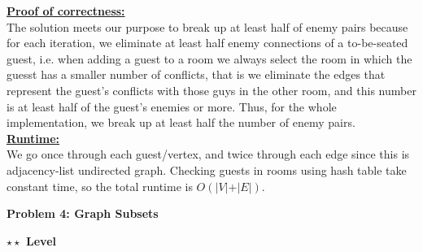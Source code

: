 \documentclass{article}\usepackage[utf8]{inputenc}
\begin{document}
%
\underline{\textbf{Proof of correctness:}}\\
The solution meets our purpose to break up at least half of enemy pairs because for each iteration, we eliminate at least half enemy connections of a to-be-seated guest, i.e. when adding a guest to a room we always select the room in which the guesst has a smaller number of conflicts, that is we eliminate the edges that represent the guest's conflicts with those guys in the other room, and this number is at least half of the guest's enemies or more. Thus, for the whole implementation, we break up at least half the number of enemy pairs.\\
\underline{\textbf{Runtime:}}\\
We go once through each guest/vertex, and twice through each edge since this is adjacency-list undirected graph. Checking guests in rooms using hash table take constant time, so the total runtime is $O(\vert V\vert + \vert E\vert)$.  
\EndSolution
\clearpage

\vspace{-2mm}\noindent\begin{mybox}{\begin{center}\textbf{\color{black}Problem 4: Graph Subsets}\end{center}}\end{mybox}\vspace{-2mm}
\begin{myboxot}\noindent\textbf{$\star\star$ Level}\end{myboxot} 
\end{document}
